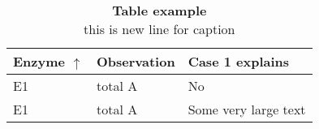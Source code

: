 \documentclass{article}
\begin{document}
	
	
	\begin{table}
		\centering
		\caption{\textbf{Table example } \\ this is new line for caption\label{other_data}}
		
		\begin{tabular}{| >{\centering\arraybackslash}m{3cm} | >{\centering\arraybackslash}m{3cm} | >{\centering\arraybackslash}m{4cm} |}
			\hline
			\textbf {Enzyme} $\uparrow$ & \textbf{Observation} & \textbf {Case 1 explains}\parbox{0pt}{\rule{0pt}{2ex+\baselineskip}}\\ \hline 
			E1  & total A & No \\[0ex] \hline
			E1  & total A & Some very large text \parbox{0pt}{\rule{0pt}{2ex+\baselineskip}}\\\hline
			\end{tabular}
		
		
	\end{table} 
	
	
\end{document}
